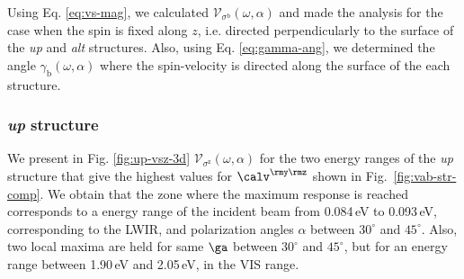\documentclass[prb,11pt,tightenlines,twocolumn,aps]{revtex4-1}
\begin{document}
Using Eq. \eqref{eq:vs-mag}, we calculated 
$\mathcal{V}_{\sigma^{\mathrm{b}}}(\omega,\alpha)$ 
and made the analysis for the case when the spin is fixed
along $z$, i.e. directed perpendicularly to the surface of the \emph{up} and
\emph{alt} structures. Also, using Eq. \eqref{eq:gamma-ang}, we determined the
angle $\gamma_{\mathrm{b}}(\omega,\alpha)$ where the spin-velocity is directed
along the surface of the each structure.
% 

\subsubsection{{\it up} structure}\label{up:fs}

We present in Fig. \ref{fig:up-vsz-3d} 
$\mathcal{V}_{\sigma^{\mathrm{z}}} (\omega,\alpha)$
for the two energy ranges of the \emph{up} structure that give the
highest values for $\calv^{\rmy\rmz}$ shown in Fig.~\ref{fig:vab-str-comp}.
% 
We obtain that the zone where the maximum response is reached corresponds to
a energy range of the incident beam from 0.084\,eV to 0.093\,eV, 
corresponding to the LWIR,
and polarization angles $\alpha$ 
between $30^{\circ}$ and $45^{\circ}$. 
Also,  two local maxima are held for same 
$\ga$ between $30^{\circ}$ and $45^{\circ}$, 
but for an energy range between 1.90\,eV and 2.05\,eV, in the VIS
range.
\end{document}
